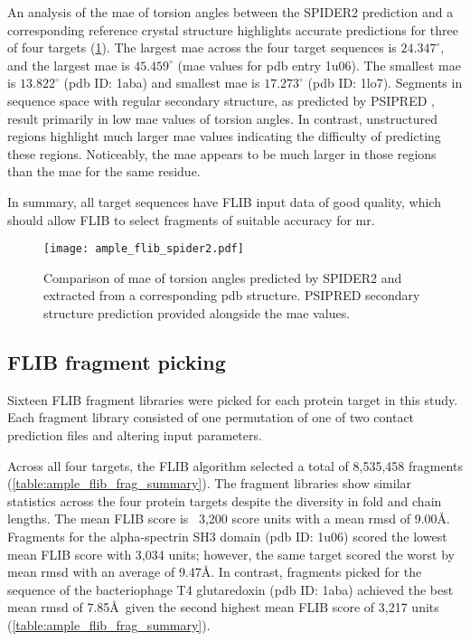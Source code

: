 An analysis of the \gls{mae} of torsion angles between the SPIDER2 \cite{Heffernan2015-wp} prediction and a corresponding reference crystal structure highlights accurate predictions for three of four targets (\cref{fig:ample_flib_spider2}). The largest \gls{mae}\textsubscript{\textphi} across the four target sequences is $24.347^{\circ}$, and the largest \gls{mae}\textsubscript{\textpsi} is $45.459^{\circ}$ (\gls{mae} values for \gls{pdb} entry 1u06). The smallest \gls{mae}\textsubscript{\textphi} is $13.822^{\circ}$ (\gls{pdb} ID: 1aba) and smallest \gls{mae}\textsubscript{\textpsi} is $17.273^{\circ}$ (\gls{pdb} ID: 1lo7). Segments in sequence space with regular secondary structure, as predicted by PSIPRED \cite{Jones1999-fi}, result primarily in low \gls{mae} values of torsion angles. In contrast, unstructured regions highlight much larger \gls{mae} values indicating the difficulty of predicting these regions. Noticeably, the \gls{mae}\textsubscript{\textpsi} appears to be much larger in those regions than the \gls{mae}\textsubscript{\textphi} for the same residue.

In summary, all target sequences have FLIB input data of good quality, which should allow FLIB to select fragments of suitable accuracy for \gls{mr}.

\begin{figure}[H]
	\centering
	\texttt{[image: ample\_flib\_spider2.pdf]}
	\caption[SPIDER2 torsion angle prediction analysis of FLIB targets]{Comparison of \gls{mae} of torsion angles predicted by SPIDER2 and extracted from a corresponding \gls{pdb} structure. PSIPRED \cite{Jones1999-fi} secondary structure prediction provided alongside the \gls{mae} values.}
	\label{fig:ample_flib_spider2}
\end{figure}

\subsection{FLIB fragment picking}
Sixteen FLIB fragment libraries were picked for each protein target in this study. Each fragment library consisted of one permutation of one of two contact prediction files and altering input parameters.

Across all four targets, the FLIB algorithm selected a total of 8,535,458 fragments (\cref{table:ample_flib_frag_summary}). The fragment libraries show similar statistics across the four protein targets despite the diversity in fold and chain lengths. The mean FLIB score is ~3,200 score units with a mean \gls{rmsd} of 9.00\AA. Fragments for the alpha-spectrin SH3 domain (\gls{pdb} ID: 1u06) scored the lowest mean FLIB score with 3,034 units; however, the same target scored the worst by mean \gls{rmsd} with an average of 9.47\AA. In contrast, fragments picked for the sequence of the bacteriophage T4 glutaredoxin (\gls{pdb} ID: 1aba) achieved the best mean \gls{rmsd} of 7.85\AA\ given the second highest mean FLIB score of 3,217 units (\cref{table:ample_flib_frag_summary}).

